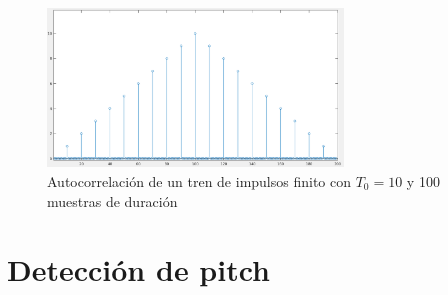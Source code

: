 \documentclass[12pt]{article}
\begin{document}
\begin{figure}[H]
	\centering
	\includegraphics[width=0.7\textwidth]{autocorr_tren_finito.png}
	\caption{Autocorrelación de un tren de impulsos finito con $T_0 = 10$ y 100 muestras de duración}
	
\end{figure}


\section{Detección de pitch}


\end{document}
